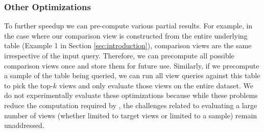 \subsubsection{Other Optimizations}
To further speedup \SeeDB we can pre-compute various partial results.
For example, in the case where our comparison view is constructed from the
  entire underlying table (Example 1 in Section \ref{sec:introduction}),
  comparison views are the same irrespective of the input query.
Therefore, we can precompute all possible comparison views once and store
  them for future use. 
%   
Similarly, if we precompute a sample of the table being queried, we can run
all view queries against this table to pick the top-$k$ views and only evaluate
those views on the entire dataset.
We do not experimentally evaluate these optimizations because while these
problems reduce the computation required by \SeeDB, the
challenges related to evaluating a large number of views (whether limited to
target views or limited to a sample) remain unaddressed.


